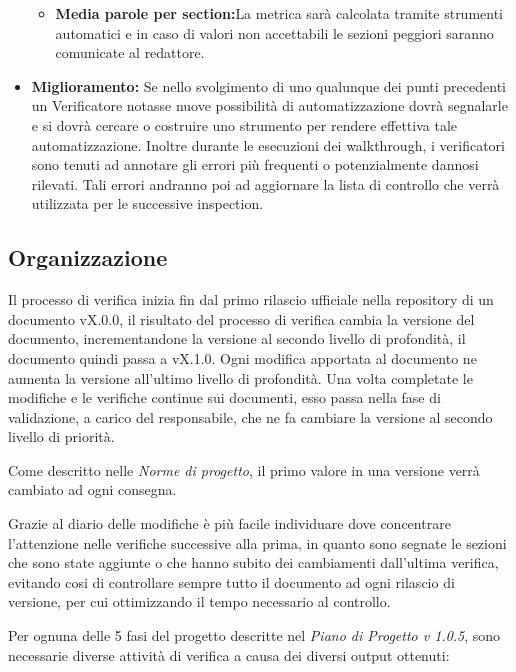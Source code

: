 \documentclass[a4paper]{article}
\begin{document}
\begin{itemize}
\begin{itemize}
						\item \textbf{Media parole per section:}La metrica sarà calcolata tramite strumenti automatici e in caso di valori non accettabili le sezioni peggiori saranno comunicate al redattore.
					\end{itemize}
					\item \textbf{Miglioramento:} Se nello svolgimento di uno qualunque dei punti precedenti un Verificatore
					notasse nuove possibilità di automatizzazione dovrà segnalarle e si dovrà cercare o costruire uno strumento per
					rendere effettiva tale automatizzazione. Inoltre durante le esecuzioni dei walkthrough, i verificatori sono
					tenuti ad annotare gli errori più frequenti o potenzialmente dannosi rilevati. Tali errori andranno poi ad
					aggiornare la lista di controllo che verrà utilizzata per le successive inspection.
				\end{itemize}		
		\subsection{Organizzazione}
			Il processo di verifica inizia fin dal primo rilascio ufficiale nella repository di un documento vX.0.0, il risultato 
			del processo di verifica cambia la versione del documento, incrementandone la versione al secondo livello di profondità, 
			il documento quindi passa a vX.1.0. Ogni modifica apportata al documento ne aumenta la versione all'ultimo livello di 
			profondità. Una volta completate le modifiche e le verifiche continue sui documenti, esso passa nella fase di validazione,
			a carico del responsabile, che ne fa cambiare la versione al secondo livello di priorità. 
			
			Come descritto nelle \emph{Norme di progetto}, il primo valore in una versione verrà cambiato ad ogni consegna.
			
			Grazie al diario delle modifiche è più facile individuare dove concentrare l'attenzione nelle verifiche successive 
			alla prima, in quanto sono segnate le sezioni che sono state aggiunte o che hanno subito dei cambiamenti dall'ultima
			 verifica, evitando cosi di controllare sempre tutto il documento ad ogni rilascio di versione, per cui ottimizzando 
			 il tempo necessario al controllo.

			Per ognuna delle 5 fasi del progetto descritte nel \emph{Piano di Progetto v 1.0.5}, sono necessarie diverse attività 
			di verifica a causa dei diversi output ottenuti:
\end{document}
